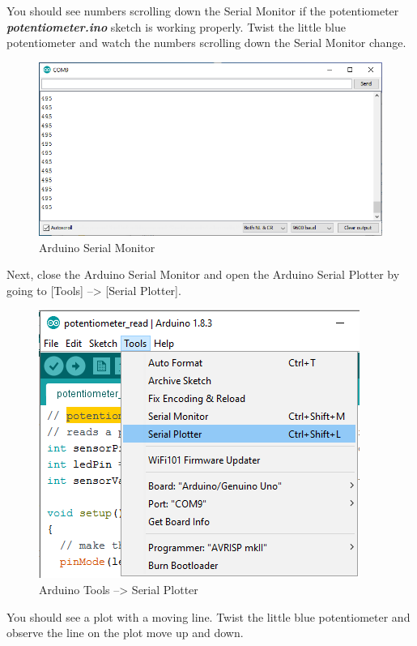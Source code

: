 \documentclass[11pt]{article}
\begin{document}
You should see numbers scrolling down the Serial Monitor if the
potentiometer \textbf{\emph{potentiometer.ino}} sketch is working
properly. Twist the little blue potentiometer and watch the numbers
scrolling down the Serial Monitor change.

\begin{figure}
\centering
\includegraphics{images/serial_monitor_output.png}
\caption{Arduino Serial Monitor}
\end{figure}

Next, close the Arduino Serial Monitor and open the Arduino Serial
Plotter by going to {[}Tools{]} --\textgreater{} {[}Serial Plotter{]}.

\begin{figure}
\centering
\includegraphics{images/Tools_SerialPlotter.png}
\caption{Arduino Tools --\textgreater{} Serial Plotter}
\end{figure}

You should see a plot with a moving line. Twist the little blue
potentiometer and observe the line on the plot move up and down.
\end{document}

